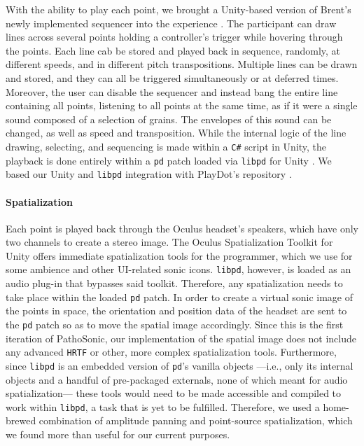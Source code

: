 \documentclass{nime-alternate}
\begin{document}
With the ability to play each point, we brought a Unity-based version of Brent's newly implemented sequencer into the experience \cite{wbrent2019}. The participant can draw lines across several points holding a controller's trigger while hovering through the points. Each line cab be stored and played back in sequence, randomly, at different speeds, and in different pitch transpositions. Multiple lines can be drawn and stored, and they can all be triggered simultaneously or at deferred times. Moreover, the user can disable the sequencer and instead bang the entire line containing all points, listening to all points at the same time, as if it were a single sound composed of a selection of grains. The envelopes of this sound can be changed, as well as speed and transposition. While the internal logic of the line drawing, selecting, and sequencing is made within a \texttt{C\#} script in Unity, the playback is done entirely within a \texttt{pd} patch loaded via \texttt{libpd} for Unity \cite{libpd2019}. We based our Unity and \texttt{libpd} integration with PlayDot's repository \cite{playdots2019}.


\paragraph{Spatialization}

Each point is played back through the Oculus headset's speakers, which have only two channels to create a stereo image. The Oculus Spatialization Toolkit for Unity offers immediate spatialization tools for the programmer, which we use for some ambience and other UI-related sonic icons. \texttt{libpd}, however, is loaded as an audio plug-in that bypasses said toolkit. Therefore, any spatialization needs to take place within the loaded \texttt{pd} patch. In order to create a virtual sonic image of the points in space, the orientation and position data of the headset are sent to the \texttt{pd} patch so as to move the spatial image accordingly. Since this is the first iteration of PathoSonic, our implementation of the spatial image does not include any advanced \texttt{HRTF} or other, more complex spatialization tools. Furthermore, since \texttt{libpd} is an embedded version of \texttt{pd}'s vanilla objects ---i.e., only its internal objects and a handful of pre-packaged externals, none of which meant for audio spatialization--- these tools would need to be made accessible and compiled to work within \texttt{libpd}, a task that is yet to be fulfilled. Therefore, we used a home-brewed combination of amplitude panning and point-source spatialization, which we found more than useful for our current purposes.
\end{document}
